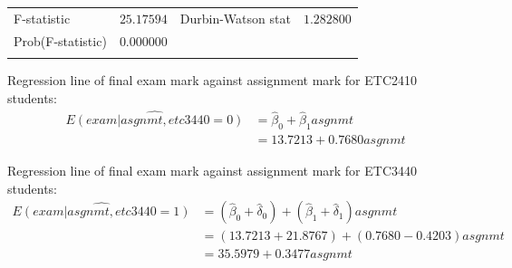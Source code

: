 \documentclass[12pt]{report}
\begin{document}
\begin{table}[H]
\begin{tabular}{lrrrr}
		\multicolumn{1}{l}{F-statistic}&\multicolumn{1}{r}{$25.17594$}&\multicolumn{2}{l}{Durbin-Watson stat}&\multicolumn{1}{r}{$1.282800$}\\
		\multicolumn{1}{l}{Prob(F-statistic)}&\multicolumn{1}{r}{$0.000000$}&\multicolumn{1}{c}{}&\multicolumn{1}{c}{}&\multicolumn{1}{c}{}\\
		[4.5pt] \hline \\ [-4.5pt]
	\end{tabular}
\end{table}

\vspace{-\baselineskip}
\noindent Regression line of final exam mark against assignment mark for ETC2410 students:
\begin{align*}
	\widehat{E(exam|asgnmt,etc3440=0)} &= \hat{\beta}_0 + \hat{\beta}_1asgnmt \\
	&= 13.7213 + 0.7680asgnmt 
\end{align*}


\noindent Regression line of final exam mark against assignment mark for ETC3440 students:
\begin{align*}
\widehat{E(exam|asgnmt,etc3440=1)} &= (\hat{\beta}_0 + \hat{\delta}_0) + (\hat{\beta}_1 + \hat{\delta}_1)asgnmt \\
&= (13.7213+21.8767) + (0.7680-0.4203)asgnmt \\
&= 35.5979+0.3477asgnmt
\end{align*}
\end{document}
